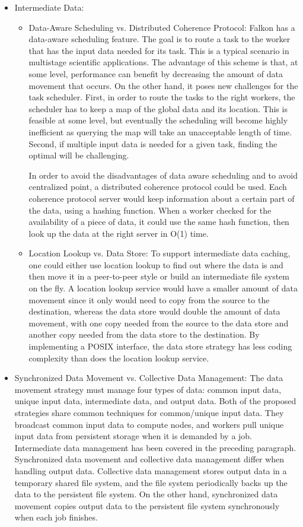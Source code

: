 \documentclass[10pt,letterpaper]{article}
\begin{document}
\begin{itemize}
\begin{itemize}
      \item Intermediate Data:
	\begin{itemize}
	\item Data-Aware Scheduling vs. Distributed Coherence Protocol:
	    Falkon has a data-aware scheduling feature. The goal is to route a task to the worker that has the input data needed for its task. This is a typical scenario in multistage scientific applications.
The advantage of this scheme is that, at some level, performance can benefit by decreasing the amount of data movement that occurs. On the other hand, it poses new challenges for the task scheduler. First, in order to route the tasks to the right workers, the scheduler has to keep a map of the global data and its location. This is feasible at some level, but eventually the scheduling will become highly inefficient as querying the map will take an unacceptable length of time. Second, if multiple input data is needed for a given task, finding the optimal will be challenging.

	    In order to avoid the disadvantages of data aware scheduling and to avoid centralized point, a distributed coherence protocol could be used. Each coherence protocol server would keep information about a certain part of the data, using a hashing function. When a worker checked for the availability of a piece of data, it could use the same hash function, then look up the data at the right server in O(1) time.
	    
	  \item Location Lookup vs. Data Store:
To support intermediate data caching, one could either use location lookup to find out where the data is and then move it in a peer-to-peer style or build an intermediate file system on the fly. A location lookup service would have a smaller amount of data movement since it only would need to copy from the source to the destination, whereas the data store would double the amount of data movement, with one copy needed from the source to the data store and another copy needed from the data store to the destination. By implementing a POSIX interface, the data store strategy has less coding complexity  than does the location lookup service.
	\end{itemize}

      \item Synchronized Data Movement vs. Collective Data Management:
The data movement strategy must manage four types of data: common input data, unique input data, intermediate data, and output data. Both of the proposed strategies share common techniques for common/unique input data. They broadcast common input data to compute nodes, and workers pull unique input data from persistent storage when it is demanded by a job. Intermediate data management has been covered in the preceding paragraph. Synchronized data movement and collective data management differ when handling output data. Collective data management stores output data in a temporary shared file system, and the file system periodically backs up the data to the persistent file system. On the other hand,  synchronized data movement copies output data to the persistent file system synchronously when each job finishes.


\end{itemize}
\end{itemize}
\end{document}
